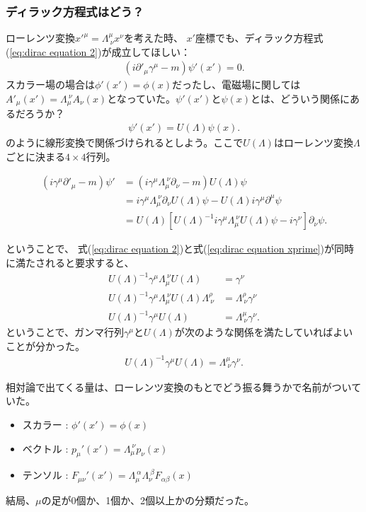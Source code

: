\documentclass[10pt,a4paper]{jarticle}
\begin{document}
\subsubsection{ディラック方程式はどう？}
ローレンツ変換${x'}^\mu = \Lambda^\mu_{~\nu} x^\nu$を考えた時、
$x'$座標でも、ディラック方程式(\ref{eq:dirac equation 2})が成立してほしい：
\begin{align}
(i\partial'_\mu \gamma^\mu - m ) \psi'(x') = 0. \label{eq:dirac equation xprime}
\end{align}
スカラー場の場合は$\phi'(x') = \phi(x)$だったし、電磁場に関しては$A'_\mu(x') = \Lambda_\mu^{~\nu} A_\nu(x)$となっていた。$\psi'(x')$と$\psi(x)$とは、どういう関係にあるだろうか？
\begin{align}
\psi'(x') = U(\Lambda) \psi(x).
\end{align}
のように線形変換で関係づけられるとしよう。ここで$U(\Lambda)$はローレンツ変換$\Lambda$ごとに決まる$4\times 4$行列。

\begin{align}
(i\gamma^\mu \partial'_\mu - m ) \psi'
&=
(i\gamma^\mu \Lambda_\mu^{~\nu} \partial_\nu - m ) U(\Lambda) \psi \nonumber\\
&=
i\gamma^\mu \Lambda_\mu^{~\nu} \partial_\nu U(\Lambda) \psi
- U(\Lambda) i\gamma^\mu \partial^\mu \psi \nonumber\\
&=
U(\Lambda) [ U(\Lambda)^{-1} i\gamma^\mu \Lambda_\mu^{~\nu} U(\Lambda) \psi
- i\gamma^\nu ] \partial_\nu \psi.
\end{align}

ということで、
式(\ref{eq:dirac equation 2})と式(\ref{eq:dirac equation xprime})が同時に満たされると要求すると、
\begin{align}
U(\Lambda)^{-1} \gamma^\mu \Lambda_\mu^{~\nu} U(\Lambda) &= \gamma^\nu \nonumber\\
U(\Lambda)^{-1} \gamma^\mu \Lambda_\mu^{~\nu} U(\Lambda) \Lambda^\rho_{~\nu} &= \Lambda^\rho_{~\nu} \gamma^\nu \nonumber\\
U(\Lambda)^{-1} \gamma^\mu U(\Lambda) &= \Lambda^\mu_{~\nu} \gamma^\nu.
\end{align}
ということで、ガンマ行列$\gamma^\mu$と$U(\Lambda)$が次のような関係を満たしていればよいことが分かった。
\begin{align}
U(\Lambda)^{-1} \gamma^\mu U(\Lambda) = \Lambda^\mu_{~\nu} \gamma^\nu. \label{eq:dirac matrix lorentz inv}
\end{align}


相対論で出てくる量は、ローレンツ変換のもとでどう振る舞うかで名前がついていた。
\begin{itemize}
\item スカラー  : $\phi'(x') = \phi(x)$
\item ベクトル : $p_\mu'(x') = \Lambda_{\mu}^{~\nu} p_\nu(x)$
\item テンソル : $F_{\mu\nu}'(x') = \Lambda_{\mu}^{~\alpha} \Lambda_{\nu}^{~\beta} F_{\alpha\beta}(x)$
\end{itemize}
結局、$\mu$の足が0個か、1個か、2個以上かの分類だった。
\end{document}
